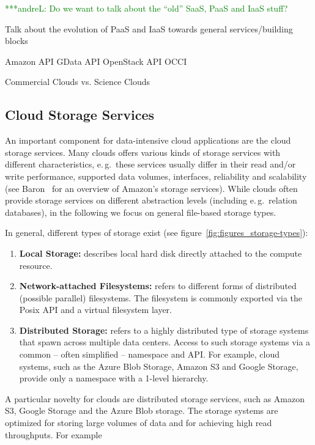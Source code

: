 \documentclass[times]{cpeauth}
\newcommand{\alnote}[1]{ {\textcolor{green} { ***andreL: #1 }}}
\newcommand{\alnote}[1]{}
\begin{document}
\alnote{Do we want to talk about the ``old'' SaaS, PaaS and IaaS stuff?}

Talk about the evolution of PaaS and IaaS towards general services/building 
blocks

Amazon API
GData API
OpenStack API
OCCI


Commercial Clouds vs. Science Clouds



\subsection{Cloud Storage Services}

An important component for data-intensive cloud applications are the cloud
storage services. Many clouds offers various kinds of storage services with
different characteristics, e.\,g.\ these services usually differ in their read
and/or write performance, supported data volumes, interfaces, reliability and
scalability (see Baron~\cite{baron2010} for an overview of Amazon's storage
services). While clouds often provide storage services on different 
abstraction levels (including e.\,g.\ relation databases), in the following we 
focus on general file-based storage types.

In general, different types of storage exist (see figure~\ref{fig:figures_storage-types}):

\begin{enumerate}
	\item \textbf{Local Storage:} describes local hard disk directly attached 
	to the compute resource.
	\item \textbf{Network-attached Filesystems:} refers to different forms of 
	distributed (possible parallel) filesystems. The filesystem is commonly 
	exported via the Posix API and a virtual filesystem layer.
	\item \textbf{Distributed Storage:} refers to a highly distributed type of 
	storage systems that spawn across multiple data centers. Access to such 
	storage systems via a common -- often simplified -- namespace and API. For 
	example, cloud systems, such as the Azure Blob Storage, Amazon S3 and 
	Google Storage, provide only a namespace with a 1-level hierarchy. 
\end{enumerate}


A particular novelty for clouds are distributed storage services, such as
Amazon S3, Google Storage and the Azure Blob storage. The storage systems are
optimized for storing large volumes of data and for achieving high
read throughputs. For example
\end{document}
